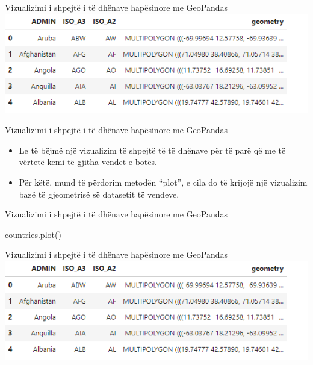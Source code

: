 \documentclass[
  ignorenonframetext,
]{beamer}
\newenvironment{Shaded}{\begin{snugshade}}{\end{snugshade}}
\newcommand{\NormalTok}[1]{#1}
\begin{document}
\begin{frame}{Vizualizimi i shpejtë i të dhënave hapësinore me
GeoPandas}
\protect\hypertarget{vizualizimi-i-shpejtuxeb-i-tuxeb-dhuxebnave-hapuxebsinore-me-geopandas}{}
\includegraphics{./Figs/countries.png}
\end{frame}

\begin{frame}{Vizualizimi i shpejtë i të dhënave hapësinore me
GeoPandas}
\protect\hypertarget{vizualizimi-i-shpejtuxeb-i-tuxeb-dhuxebnave-hapuxebsinore-me-geopandas-1}{}
\begin{itemize}
\item
  Le të bëjmë një vizualizim të shpejtë të të dhënave për të parë që me
  të vërtetë kemi të gjitha vendet e botës.
\item
  Për këtë, mund të përdorim metodën ``plot'', e cila do të krijojë një
  vizualizim bazë të gjeometrisë së datasetit të vendeve.
\end{itemize}
\end{frame}

\begin{frame}[fragile]{Vizualizimi i shpejtë i të dhënave hapësinore me
GeoPandas}
\protect\hypertarget{vizualizimi-i-shpejtuxeb-i-tuxeb-dhuxebnave-hapuxebsinore-me-geopandas-2}{}

\begin{Shaded}
\begin{Highlighting}[]
\NormalTok{countries.plot()}
\end{Highlighting}
\end{Shaded}
\end{frame}

\begin{frame}{Vizualizimi i shpejtë i të dhënave hapësinore me
GeoPandas}
\protect\hypertarget{vizualizimi-i-shpejtuxeb-i-tuxeb-dhuxebnave-hapuxebsinore-me-geopandas-3}{}
\includegraphics{./Figs/countries.png}
\end{frame}
\end{document}
